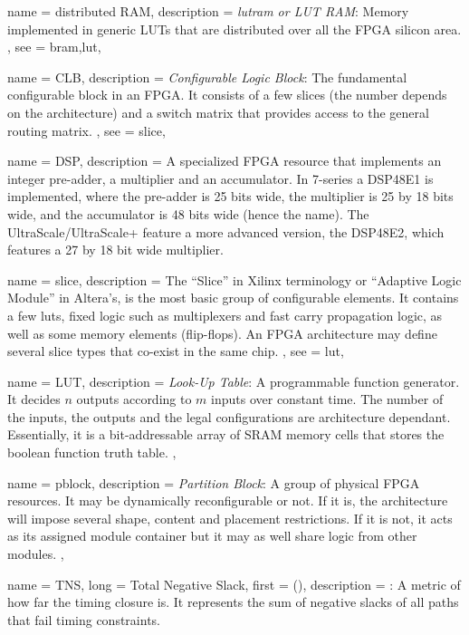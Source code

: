 {
	name = {distributed RAM},
	description = {\emph{\Gls{lutram} or LUT RAM}:
		Memory implemented in generic LUTs that are distributed over all the FPGA silicon area.
	},
	see = {bram,lut},
}


{
	name = {CLB},
	description = {\emph{Configurable Logic Block}:
		The fundamental configurable block in an FPGA. It consists of a few \Glspl{slice}
		(the number depends on the architecture) and a switch matrix that provides
		access to the general routing matrix.
	},
	see = {slice},
}

{
	name = {DSP},
	description = {
		A specialized FPGA resource that implements an integer pre-adder,
		a multiplier and an accumulator. In 7-series a DSP48E1 is implemented,
		where the pre-adder is 25 bits wide, the multiplier is 25 by 18 bits wide,
		and the accumulator is 48 bits wide (hence the name). 
		The UltraScale/UltraScale+ feature a more advanced version, the DSP48E2,
		which features a 27 by 18 bit wide multiplier.
	}
}


{
	name = {slice},
	description = {
		The ``Slice'' in Xilinx terminology or ``Adaptive Logic Module'' in Altera's,
		is the most basic group of configurable elements. It contains a few \glspl{lut},
		fixed logic such as multiplexers and fast carry propagation logic, as well as
		some memory elements (flip-flops). An FPGA architecture may define several slice types
		that co-exist in the same chip.
	},
	see = {lut},
}

{
	name = {LUT},
	description = {\emph{Look-Up Table}: 
		A programmable function generator. It decides $n$ outputs according to $m$ inputs
		over constant time. 
		The number of the inputs, the outputs and the legal configurations
		are architecture dependant. 
		Essentially, it is a bit-addressable array of SRAM memory cells
		that stores the boolean function truth table.
	},
}

{
	name = {pblock},
	description = {\emph{Partition Block}:
		A group of physical FPGA resources. It may be dynamically reconfigurable or not.
		If it is, the architecture will impose several shape, content and placement restrictions.
		If it is not, it acts as its assigned module container but it may as well share logic
		from other modules.
	},
}

{
	name = {TNS},
	long = {Total Negative Slack},
	first = { ()},
	description = {\emph{}:
		A metric of how far the timing closure is. It represents the sum
		of negative slacks of all paths that fail timing constraints.
	}
}

